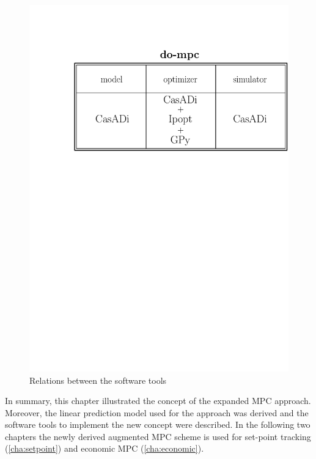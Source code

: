 \begin{figure}[t]
\begin{center}
	\includegraphics[width=\textwidth]{../Figures/implementation_software.pdf}
	\caption{Relations between the software tools}
	\label{fig:implementation_software}
\end{center}
\end{figure}

In summary, this chapter illustrated the concept of the expanded MPC approach.
Moreover, the linear prediction model used for the approach was derived and the software tools to implement the new concept were described.
In the following two chapters the newly derived augmented MPC scheme is used for set-point tracking (\cref{cha:setpoint}) and economic MPC (\cref{cha:economic}).